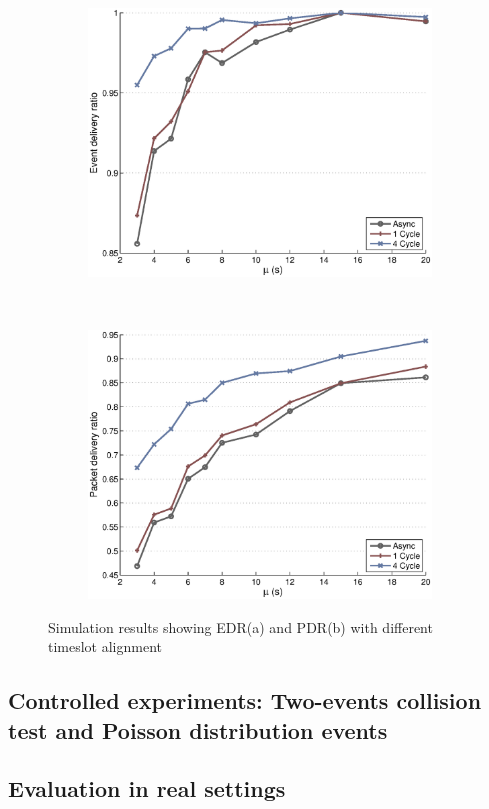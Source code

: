 \begin{figure}[p]
    \centering
    \begin{subfigure}[t]{0.7\textwidth}
        \centering
        \includegraphics[width=\textwidth] {../../sw/pc/matlab/simulation-result/slotting-edr-20min.eps}
        \caption{}
    \end{subfigure} 
    \\
    \begin{subfigure}[t]{0.7\textwidth}
        \centering
        \includegraphics[width=\textwidth] {../../sw/pc/matlab/simulation-result/slotting-pdr-20min.eps}
        \caption{}
    \end{subfigure}
    \caption[EDR and PDR with different timeslot alignment]{Simulation results showing EDR(a) and PDR(b) with different timeslot alignment}\label{fig:edr-pdr-slotting}
\end{figure}

\subsection{Controlled experiments: Two-events collision test and Poisson distribution events}

\subsection{Evaluation in real settings}


